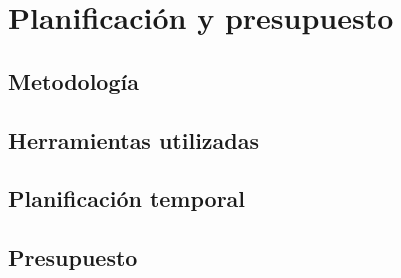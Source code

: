 \chapter{Planificación y presupuesto}
\section{Metodología}
\section{Herramientas utilizadas}
\section{Planificación temporal}
\section{Presupuesto}